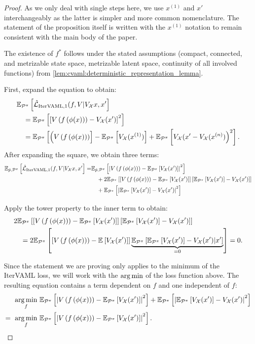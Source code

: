 \begin{proof}

As we only deal with single steps here, we use $x^{(1)}$ and $x'$ interchangeably as the latter is simpler and more common nomenclature.
The statement of the proposition itself is written with the $x^{(1)}$ notation to remain consistent with the main body of the paper.

The existence of $f^*$ follows under the stated assumptions (compact, connected, and metrizable state space, metrizable latent space, continuity of all involved functions) from \autoref{lem:cvaml:deterministic_representation_lemma}.

First, expand the equation to obtain:
\begin{align}
     &\mathbb{E}_{\mathcal{P}^\pi}\left[  \hat{\mathcal{L}}_{\text{IterVAML}, 1}(f, V | V_\mathcal{X} x, x'  \right] \\
    &\quad = \mathbb{E}_{\mathcal{P}^\pi}\left[  \left[ V\left( f\left( \phi(x) \right) \right) - V_\mathcal{X}(x') \right]^2 \right]\\
    &\quad = \mathbb{E}_{\mathcal{P}^\pi}\left[  \Bigl(V\left( f\left( \phi(x) \right) \right) \right] - \mathbb{E}_{\mathcal{P}^\pi}\left[  V_\mathcal{X}(x^{(1)}) \right] + \mathbb{E}_{\mathcal{P}^\pi}\left[  V_\mathcal{X}(x' - V_\mathcal{X}(x^{(n)}) \Bigr)^2 \right].
\end{align}
After expanding the square, we obtain three terms:
\begin{align}
     \mathbb{E}_{\hat{p},\mathcal{P}^\pi}\left[  \hat{\mathcal{L}}_{\text{IterVAML}, 1}(f, V | V_\mathcal{X} x, x'  \right] =
      &\mathbb{E}_{\hat{p},\mathcal{P}^\pi}\left[  \left|{V\left( f\left( \phi(x) \right) \right) - \mathbb{E}_{\mathcal{P}^\pi}\left[  V_\mathcal{X}(x') \right]}\right|^2 \right] \\
    &\quad + 2 \mathbb{E}_{\mathcal{P}^\pi}\left[  \left[ V\left( f\left( \phi(x) \right) \right) - \mathbb{E}_{\mathcal{P}^\pi}\left[  V_\mathcal{X}(x') \right] \right]\left[ \mathbb{E}_{\mathcal{P}^\pi}\left[  V_\mathcal{X}(x') \right] - V_\mathcal{X}(x')  \right] \right]\\
    &\quad + \mathbb{E}_{\mathcal{P}^\pi}\left[  \left|{\mathbb{E}_{\mathcal{P}^\pi}\left[  V_\mathcal{X}(x') \right] - V_\mathcal{X}(x') }\right|^2 \right]
\end{align}

Apply the tower property to the inner term to obtain: 
\begin{align}
&2\mathbb{E}_{\mathcal{P}^\pi}\left[  \left[ V\left( f\left( \phi(x) \right) \right) - \mathbb{E}_{\mathcal{P}^\pi}\left[  V_\mathcal{X}(x') \right] \right]\left[ \mathbb{E}_{\mathcal{P}^\pi}\left[  V_\mathcal{X}(x') \right] - V_\mathcal{X}(x')  \right] \right]\\
&\quad =2\mathbb{E}_{\mathcal{P}^\pi}\left[  \left[ V\left( f\left( \phi(x) \right) \right) - \mathbb{E}_{}\left[  V_\mathcal{X}(x') \right] \right]\underbrace{\mathbb{E}_{\mathcal{P}^\pi}\left[  \mathbb{E}_{\mathcal{P}^\pi}\left[  V_\mathcal{X}(x') \right] - V_\mathcal{X}(x') \middle|x' \right]}_{=0} \right] = 0.
\end{align}

Since the statement we are proving only applies to the minimum of the IterVAML loss, we will work with the $\operatorname*{arg\,min}$ of the loss function above.
The resulting equation contains a term dependent on $f$ and one independent of $f$:
\begin{align}
    \operatorname*{arg\,min}_f~ & \mathbb{E}_{\mathcal{P}^\pi}\left[  \left|{V\left( f\left( \phi(x) \right) \right) - \mathbb{E}_{\mathcal{P}^\pi}\left[  V_\mathcal{X}(x') \right]}\right|^2 \right] + \mathbb{E}_{\mathcal{P}^\pi}\left[  \left|{\mathbb{E}_{\mathcal{P}^\pi}\left[  V_\mathcal{X}(x') \right] - V_\mathcal{X}(x') }\right|^2 \right]\\
    =~ \operatorname*{arg\,min}_f~ & \mathbb{E}_{\mathcal{P}^\pi}\left[  \left|{V\left( f\left( \phi(x) \right) \right) - \mathbb{E}_{\mathcal{P}^\pi}\left[  V_\mathcal{X}(x') \right]}\right|^2 \right].
\end{align}


\end{proof}
